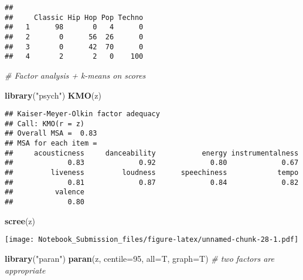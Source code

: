 \documentclass[
]{article}
\newenvironment{Shaded}{\begin{snugshade}}{\end{snugshade}}
\newcommand{\CommentTok}[1]{\textcolor[rgb]{0.56,0.35,0.01}{\textit{#1}}}
\newcommand{\DataTypeTok}[1]{\textcolor[rgb]{0.13,0.29,0.53}{#1}}
\newcommand{\DecValTok}[1]{\textcolor[rgb]{0.00,0.00,0.81}{#1}}
\newcommand{\KeywordTok}[1]{\textcolor[rgb]{0.13,0.29,0.53}{\textbf{#1}}}
\newcommand{\NormalTok}[1]{#1}
\newcommand{\StringTok}[1]{\textcolor[rgb]{0.31,0.60,0.02}{#1}}
\begin{document}
\begin{verbatim}
##    
##     Classic Hip Hop Pop Techno
##   1      98       0   4      0
##   2       0      56  26      0
##   3       0      42  70      0
##   4       2       2   0    100
\end{verbatim}

\begin{Shaded}
\begin{Highlighting}[]
\CommentTok{# Factor analysis + k-means on scores}

\KeywordTok{library}\NormalTok{(}\StringTok{"psych"}\NormalTok{)}
\KeywordTok{KMO}\NormalTok{(z)}
\end{Highlighting}
\end{Shaded}

\begin{verbatim}
## Kaiser-Meyer-Olkin factor adequacy
## Call: KMO(r = z)
## Overall MSA =  0.83
## MSA for each item = 
##     acousticness     danceability           energy instrumentalness 
##             0.83             0.92             0.80             0.67 
##         liveness         loudness      speechiness            tempo 
##             0.81             0.87             0.84             0.82 
##          valence 
##             0.80
\end{verbatim}

\begin{Shaded}
\begin{Highlighting}[]
\KeywordTok{scree}\NormalTok{(z)}
\end{Highlighting}
\end{Shaded}

\texttt{[image: Notebook\_Submission\_files/figure-latex/unnamed-chunk-28-1.pdf]}

\begin{Shaded}
\begin{Highlighting}[]
\KeywordTok{library}\NormalTok{(}\StringTok{"paran"}\NormalTok{)}
\KeywordTok{paran}\NormalTok{(z, }\DataTypeTok{centile=}\DecValTok{95}\NormalTok{, }\DataTypeTok{all=}\NormalTok{T, }\DataTypeTok{graph=}\NormalTok{T) }\CommentTok{# two factors are appropriate}
\end{Highlighting}
\end{Shaded}
\end{document}
